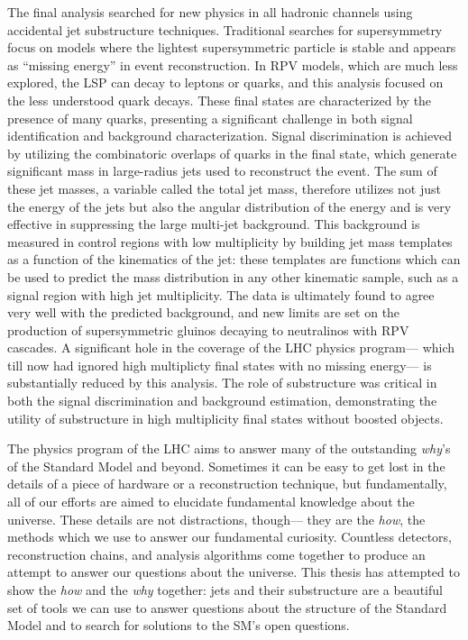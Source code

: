 The final analysis searched for new physics in all hadronic channels using accidental jet substructure techniques. Traditional searches for supersymmetry focus on models where the lightest supersymmetric particle is stable and appears as ``missing energy'' in event reconstruction. In RPV models, which are much less explored, the LSP can decay to leptons or quarks, and this analysis focused on the less understood quark decays. These final states are characterized by the presence of many quarks, presenting a significant challenge in both signal identification and background characterization. Signal discrimination is achieved by utilizing the combinatoric overlaps of quarks in the final state, which generate significant mass in large-radius jets used to reconstruct the event. The sum of these jet masses, a variable called the total jet mass, therefore utilizes not just the energy of the jets but also the angular distribution of the energy and is very effective in suppressing the large multi-jet background. This background is measured in control regions with low multiplicity by building jet mass templates as a function of the kinematics of the jet: these templates are functions which can be used to predict the mass distribution in any other kinematic sample, such as a signal region with high jet multiplicity. The data is ultimately found to agree very well with the predicted background, and new limits are set on the production of supersymmetric gluinos decaying to neutralinos with RPV cascades. A significant hole in the coverage of the LHC physics program--- which till now had ignored high multiplicty final states with no missing energy--- is substantially reduced by this analysis. The role of substructure was critical in both the signal discrimination and background estimation, demonstrating the utility of substructure in high multiplicity final states without boosted objects.


The physics program of the LHC aims to answer many of the outstanding \textit{why}'s of the Standard Model and beyond. Sometimes it can be easy to get lost in the details of a piece of hardware or a reconstruction technique, but fundamentally, all of our efforts are aimed to elucidate fundamental knowledge about the universe. These details are not distractions, though--- they are the \textit{how}, the methods which we use to answer our fundamental curiosity. Countless detectors, reconstruction chains, and analysis algorithms come together to produce an attempt to answer our questions about the universe. This thesis has attempted to show the \textit{how} and the \textit{why} together: jets and their substructure are a beautiful set of tools we can use to answer questions about the structure of the Standard Model and to search for solutions to the SM's open questions. 



